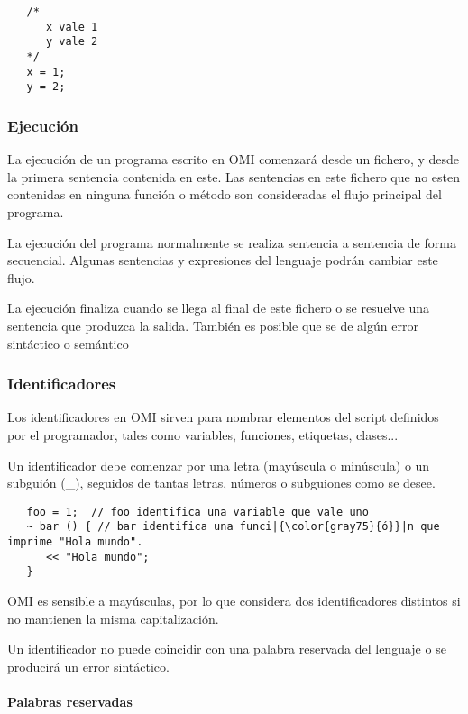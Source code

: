 \begin{lstlisting}
   /* 
      x vale 1
      y vale 2
   */
   x = 1; 
   y = 2; 
\end{lstlisting}
\subsubsection{Ejecución}\label{sec:execution}
La ejecución de un programa escrito en OMI comenzará desde un fichero, y desde la primera sentencia contenida en este. Las sentencias 
en este fichero que no esten contenidas en ninguna función o método son consideradas el flujo principal del programa.

La ejecución del programa normalmente se realiza sentencia a sentencia de forma secuencial. Algunas sentencias y expresiones del lenguaje podrán cambiar este flujo.

La ejecución finaliza cuando se llega al final de este fichero o se resuelve una sentencia que produzca la salida. También es posible que se de algún error sintáctico o semántico

\subsubsection{Identificadores}\label{sec:id}
Los identificadores en OMI sirven para nombrar elementos del script definidos por el programador,
tales como variables, funciones, etiquetas, clases...

Un identificador debe comenzar por una letra (mayúscula o minúscula) o un subguión (\_), seguidos de tantas letras, números o subguiones como se desee. \\

\begin{lstlisting}
   foo = 1;  // foo identifica una variable que vale uno
   ~ bar () { // bar identifica una funci|{\color{gray75}{ó}}|n que imprime "Hola mundo".
      << "Hola mundo";
   } 
\end{lstlisting}

OMI es sensible a mayúsculas, por lo que considera dos identificadores distintos si no mantienen la misma capitalización.

Un identificador no puede coincidir con una palabra reservada del lenguaje o se producirá un error sintáctico.

\paragraph{Palabras reservadas}

